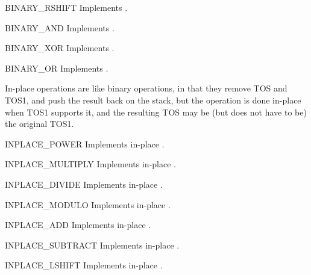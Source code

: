 \begin{opcodedesc}{BINARY_RSHIFT}{}
Implements .
\end{opcodedesc}

\begin{opcodedesc}{BINARY_AND}{}
Implements .
\end{opcodedesc}

\begin{opcodedesc}{BINARY_XOR}{}
Implements .
\end{opcodedesc}

\begin{opcodedesc}{BINARY_OR}{}
Implements .
\end{opcodedesc}

In-place operations are like binary operations, in that they remove TOS and
TOS1, and push the result back on the stack, but the operation is done
in-place when TOS1 supports it, and the resulting TOS may be (but does not
have to be) the original TOS1.

\begin{opcodedesc}{INPLACE_POWER}{}
Implements in-place .
\end{opcodedesc}

\begin{opcodedesc}{INPLACE_MULTIPLY}{}
Implements in-place .
\end{opcodedesc}

\begin{opcodedesc}{INPLACE_DIVIDE}{}
Implements in-place .
\end{opcodedesc}

\begin{opcodedesc}{INPLACE_MODULO}{}
Implements in-place .
\end{opcodedesc}

\begin{opcodedesc}{INPLACE_ADD}{}
Implements in-place .
\end{opcodedesc}

\begin{opcodedesc}{INPLACE_SUBTRACT}{}
Implements in-place .
\end{opcodedesc}

\begin{opcodedesc}{INPLACE_LSHIFT}{}
Implements in-place .
\end{opcodedesc}

